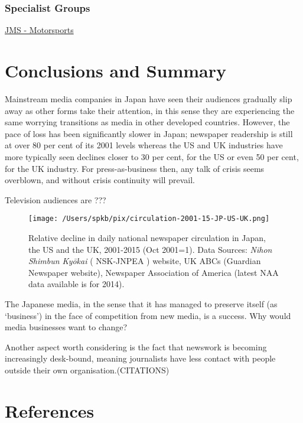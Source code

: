 \documentclass[11pt, headings=normal]{scrartcl}
\begin{document}
\hypertarget{specialist-groups}{%
\subsubsection{Specialist Groups}\label{specialist-groups}}

\href{http://www.jms.gr.jp/2sc}{JMS - Motorsports}

\hypertarget{conclusions-and-summary}{%
\section{Conclusions and Summary}\label{conclusions-and-summary}}

Mainstream media companies in Japan have seen their audiences gradually
slip away as other forms take their attention, in this sense they are
experiencing the same worrying transitions as media in other developed
countries. However, the pace of loss has been significantly slower in
Japan; newspaper readership is still at over 80 per cent of its 2001
levels whereas the US and UK industries have more typically seen
declines closer to 30 per cent, for the US or even 50 per cent, for the
UK industry. For press-as-business then, any talk of crisis seems
overblown, and without crisis continuity will prevail.

Television audiences are ???

\begin{figure}
\centering
\texttt{[image: /Users/spkb/pix/circulation-2001-15-JP-US-UK.png]}
\caption{Relative decline in daily national newspaper circulation in
Japan, the US and the UK, 2001-2015 (Oct 2001=1). Data Sources:
\emph{Nihon Shimbun Kyōkai} ( NSK-JNPEA ) website, UK ABCs (Guardian
Newspaper website), Newspaper Association of America (latest NAA data
available is for 2014).}
\end{figure}

The Japanese media, in the sense that it has managed to preserve itself
(as `business') in the face of competition from new media, is a success.
Why would media businesses want to change?

Another aspect worth considering is the fact that newswork is becoming
increasingly desk-bound, meaning journalists have less contact with
people outside their own organisation.(CITATIONS)

\hypertarget{references}{%
\section*{References}\label{references}}


\printbibliography
\end{document}
